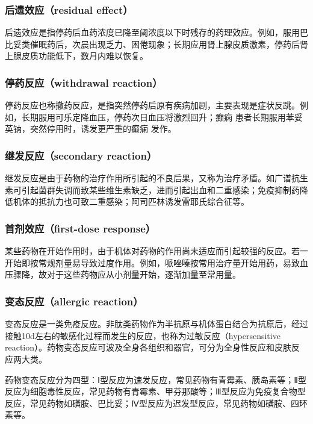 \subsubsection{后遗效应（residual effect）}

后遗效应是指停药后血药浓度已降至阈浓度以下时残存的药理效应。例如，服用巴比妥类催眠药后，次晨出现乏力、困倦现象；长期应用肾上腺皮质激素，停药后肾上腺皮质功能低下，数月内难以恢复。

\subsubsection{停药反应（withdrawal reaction）}

停药反应也称撤药反应，是指突然停药后原有疾病加剧，主要表现是症状反跳。例如，长期服用可乐定降血压，停药次日血压将激烈回升；癫痫
患者长期服用苯妥英钠，突然停用时，诱发更严重的癫痫
发作。

\subsubsection{继发反应（secondary reaction）}

继发反应是由于药物的治疗作用所引起的不良后果，又称为治疗矛盾。如广谱抗生素可引起菌群失调而致某些维生素缺乏，进而引起出血和二重感染；免疫抑制药降低机体的抵抗力也可致二重感染；阿司匹林诱发雷耶氏综合征等。

\subsubsection{首剂效应（first-dose response）}

某些药物在开始作用时，由于机体对药物的作用尚未适应而引起较强的反应。若一开始即按常规剂量易导致过度作用。例如，哌唑嗪按常用治疗量开始用药，易致血压骤降，故对于这些药物应从小剂量开始，逐渐加量至常用量。

\subsubsection{变态反应（allergic reaction）}

变态反应是一类免疫反应。非肽类药物作为半抗原与机体蛋白结合为抗原后，经过接触10d左右的敏感化过程而发生的反应，也称为过敏反应（hypersensitive
reaction）。药物变态反应可波及全身各组织和器官，可分为全身性反应和皮肤反应两大类。

药物变态反应分为四型：Ⅰ型反应为速发反应，常见药物有青霉素、胰岛素等；Ⅱ型反应为细胞毒性反应，常见药物有青霉素、甲芬那酸等；Ⅲ型反应为免疫复合物型反应，常见药物如磺胺、巴比妥；Ⅳ型反应为迟发型反应，常见药物如磺胺、四环素等。

